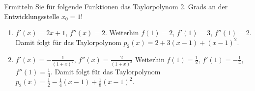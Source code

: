 \item Ermitteln Sie für folgende Funktionen das Taylorpolynom 2. Grads an der Entwicklungsstelle $x_0=1$!

\begin{enumerate}
\item $f'(x) = 2x+1$, $f''(x) = 2$. Weiterhin $f(1) = 2$, $f'(1) = 3$, $f''(1) = 2$. Damit folgt für das Taylorpolynom $p_2(x) = 2 + 3(x-1) + (x-1)^2$.
\item $f'(x) = -\frac{1}{(1+x)^2}$, $f''(x) = \frac{2}{(1+x)^3}$ Weiterhin $f(1) = \frac{1}{2}$, $f'(1) = -\frac{1}{4}$, $f''(1) = \frac{1}{4}$. Damit folgt für das Taylorpolynom $p_2(x) = \frac{1}{2} - \frac{1}{4}(x-1) + \frac{1}{8}(x-1)^2$.
\end{enumerate}
